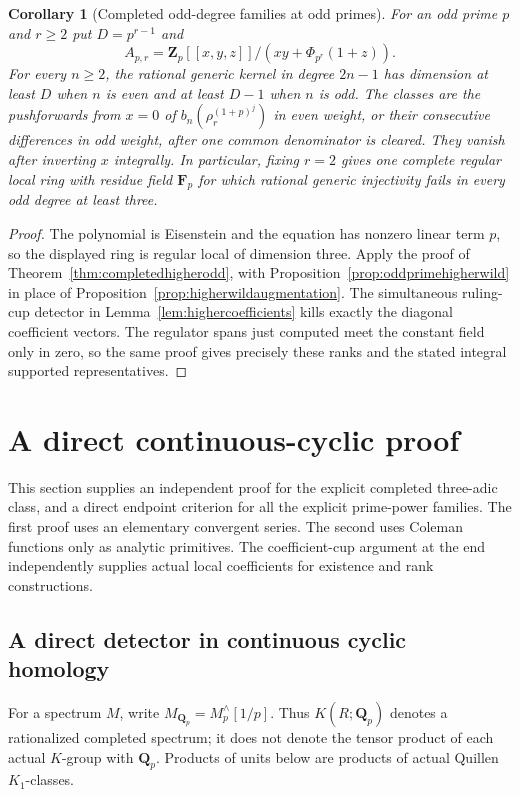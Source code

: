 \documentclass[11pt,a4paper]{article}
\newtheorem{corollary}[theorem]{Corollary}
\theoremstyle{remark}
\newcommand{\Z}{\mathbf Z}
\newcommand{\F}{\mathbf F}
\begin{document}
\begin{corollary}[Completed odd-degree families at odd primes]
\label{cor:oddprimecompletedhigher}
For an odd prime $p$ and $r\geq2$ put $D=p^{r-1}$ and
\[
 A_{p,r}=\Z_p[[x,y,z]]/(xy+\Phi_{p^r}(1+z)).
\]
For every $n\geq2$, the rational generic kernel in degree $2n-1$
has dimension at least $D$ when $n$ is even and at least $D-1$
when $n$ is odd. The classes are the pushforwards from $x=0$ of
$b_n(\rho_r^{(1+p)^j})$ in even weight, or their consecutive
differences in odd weight, after one common denominator is cleared.
They vanish after inverting $x$ integrally.
In particular, fixing $r=2$ gives one complete regular local ring
with residue field $\F_p$ for which rational generic injectivity
fails in every odd degree at least three.
\end{corollary}
\begin{proof}
The polynomial is Eisenstein and the equation has nonzero linear
term $p$, so the displayed ring is regular local of dimension three.
Apply the proof of Theorem~\ref{thm:completedhigherodd}, with
Proposition~\ref{prop:oddprimehigherwild} in place of
Proposition~\ref{prop:higherwildaugmentation}.
The simultaneous ruling-cup detector in
Lemma~\ref{lem:highercoefficients} kills exactly the diagonal
coefficient vectors. The regulator spans just computed meet the
constant field only in zero, so the same proof gives precisely
these ranks and the stated integral supported representatives.
\end{proof}

\section{A direct continuous-cyclic proof}\label{sec:directcyclic}

This section supplies an independent proof for the explicit completed
three-adic class, and a direct endpoint criterion for all the explicit
prime-power families. The first proof uses an elementary convergent
series. The second uses Coleman functions only as analytic primitives.
The coefficient-cup argument at the end independently supplies actual
local coefficients for existence and rank constructions.

\subsection{A direct detector in continuous cyclic homology}
\label{sec:directtcdetector}

For a spectrum $M$, write $M_{\mathbf Q_p}=M^{\wedge}_p[1/p]$.
Thus $K(R;\mathbf Q_p)$ denotes a rationalized completed spectrum;
it does not denote the tensor product of each actual $K$-group with
$\mathbf Q_p$. Products of units below are products of actual
Quillen $K_1$-classes.
\end{document}
